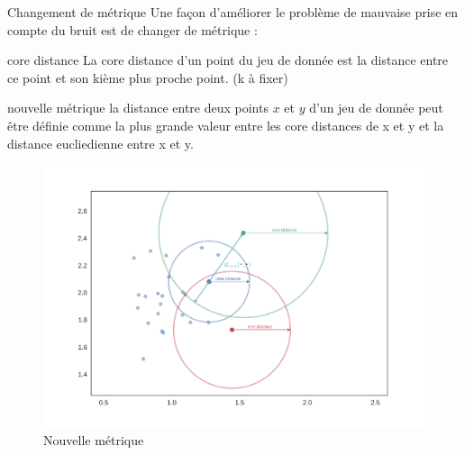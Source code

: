 \begin{frame}{Changement de métrique}
    Une façon d'améliorer le problème de mauvaise prise en compte du bruit est de changer de métrique :
    \begin{block}{core distance}
        La core distance d'un point du jeu de donnée est la distance entre ce point et son kième plus proche point. (k à fixer)
    \end{block}

    \begin{block}{nouvelle métrique}
        la distance entre deux points $x$ et $y$ d'un jeu de donnée peut être définie comme la plus grande valeur entre les core distances de x et y et la distance eucliedienne entre x et y.
    \end{block}

    \begin{figure}
        \includegraphics[width=0.5\paperheight]{images/metrique.png}
        \caption{\label{fig:metrique}Nouvelle métrique}
    \end{figure}
\end{frame}

